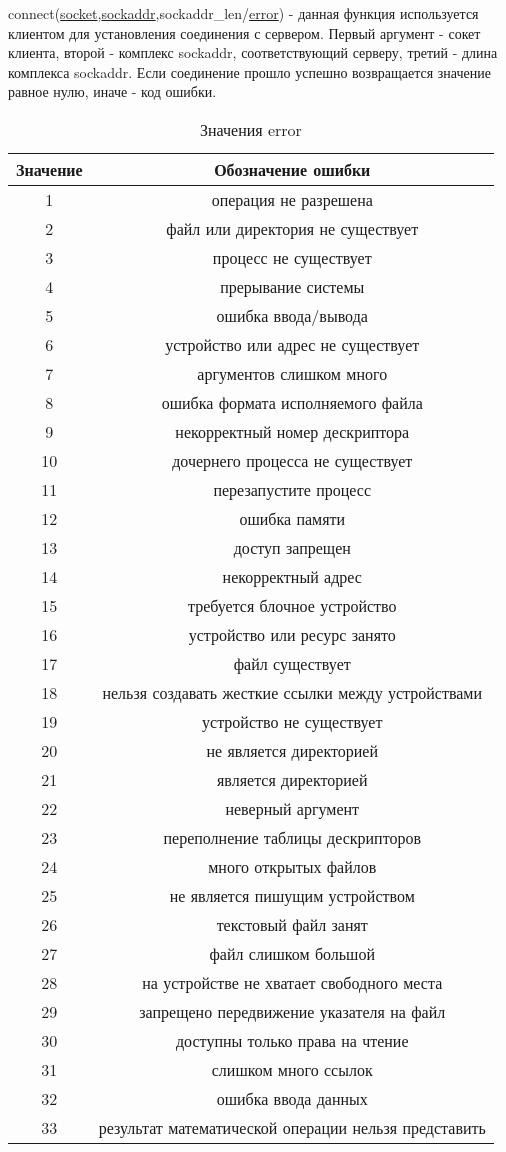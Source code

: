 \documentclass[12t,english,russian]{article}
\begin{document}
\label{connect}
connect(\hyperref[socket]{socket},\hyperref[sockaddr]{sockaddr},sockaddr\_len/\hyperref[error]{error}) - данная функция используется клиентом для установления соединения с сервером. Первый аргумент - сокет клиента, второй - комплекс sockaddr, соответствующий серверу, третий - длина комплекса sockaddr. Если соединение прошло успешно возвращается значение равное нулю, иначе - код ошибки.

\begin{center}
\begin{longtable}{|c|c|}
\caption{\label{error}Значения error}
\\ \hline
Значение & Обозначение ошибки \\
\hline
1 & операция не разрешена \\
2 & файл или директория не существует \\
3 & процесс не существует \\
4 & прерывание системы \\
5 & ошибка ввода/вывода \\
6 & устройство или адрес не существует \\
7 & аргументов слишком много \\
8 & ошибка формата исполняемого файла \\
9 & некорректный номер дескриптора \\
10 & дочернего процесса не существует \\
11 & перезапустите процесс \\
12 & ошибка памяти \\
13 & доступ запрещен \\
14 & некорректный адрес \\
15 & требуется блочное устройство \\
16 & устройство или ресурс занято\\
17 & файл существует\\
18 & нельзя создавать жесткие ссылки между устройствами\\
19 & устройство не существует\\
20 & не является директорией\\ 
21 & является директорией\\
22 & неверный аргумент \\
23 & переполнение таблицы дескрипторов \\
24 & много открытых файлов \\
25 & не является пишущим устройством\\
26 & текстовый файл занят\\
27 & файл слишком большой \\
28 & на устройстве не хватает свободного места \\
29 & запрещено передвижение указателя на файл\\
30 & доступны только права на чтение\\
31 & слишком много ссылок\\
32 & ошибка ввода данных\\
33 & результат математической операции нельзя представить\\
\hline
\end{longtable}
\end{center}
\end{document}
